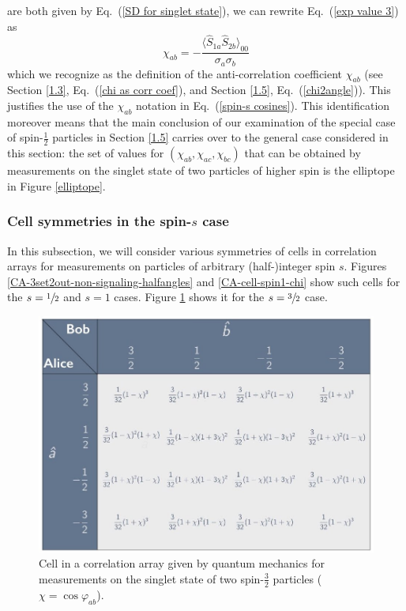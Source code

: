 are both given by Eq.\ (\ref{SD for singlet state}), we can rewrite Eq.\ (\ref{exp value 3}) as
\begin{equation}
\chi_{ab} = - \frac{\langle \hat{S}_{1a}\hat{S}_{2b}\rangle_{00}}{\sigma_a \sigma_b}
\end{equation}
which we recognize as the definition of the anti-correlation coefficient $\chi_{ab}$ (see Section \ref{1.3}, Eq.\ (\ref{chi as corr coef}), and Section \ref{1.5}, Eq.\ (\ref{chi2angle})). This justifies the use of the $\chi_{ab}$ notation in Eq.\ (\ref{spin-s cosines}). This identification moreover means that the main conclusion of our examination of the special case of spin-$\frac12$ particles in Section \ref{1.5} carries over to the general case considered in this section: the set of values for $(\chi_{ab},\chi_{ac},\chi_{bc})$ that can be obtained by measurements on the singlet state of two particles of higher spin is the elliptope in Figure \ref{elliptope}.

\subsubsection{Cell symmetries in the spin-$s$ case} \label{2.1.6}

In this subsection, we will consider various symmetries of cells in correlation arrays for measurements on particles of arbitrary (half-)integer spin $s$.  Figures \ref{CA-3set2out-non-signaling-halfangles} and \ref{CA-cell-spin1-chi} show such cells for the $s = \sfrac12$ and $s = 1$ cases. Figure \ref{CA-2set4out} shows it for the $s = \sfrac32$ case.

\begin{figure}[h]
 \centering
   \includegraphics[width=5in]{CA-2set4out.jpeg} 
   \caption{Cell in a correlation array given by quantum mechanics for measurements on the singlet state of two spin-$\frac32$ particles ($\chi = \cos{\varphi_{ab}}$).}
   \label{CA-2set4out}
\end{figure} 

